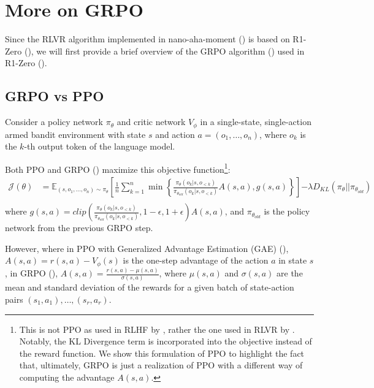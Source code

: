 \documentclass{article} %
\theoremstyle{definition}
\begin{document}
\section{More on GRPO}

Since the RLVR algorithm implemented in nano-aha-moment (\cite{nano-aha-moment}) is based on 
R1-Zero (\cite{r1}), we will first provide a brief overview of the GRPO
algorithm (\cite{grpo}) used in R1-Zero (\cite{r1}).

\subsection{GRPO vs PPO}
Consider a policy network $\pi_\theta$ and critic network $V_\phi$ in a single-state,
single-action armed bandit environment with state $s$ and action $a = (o_1, \dots, o_n)$,
where $o_k$ is the $k$-th output token of the language model.

Both PPO and GRPO (\cite{ppo, grpo}) maximize this objective function\footnote{
    This is not PPO as used in RLHF by \cite{InstructGPT-2022}, rather the one used in RLVR by \cite{grpo}.
    Notably, the KL Divergence term is incorporated into the objective instead of the reward function.
    We show this formulation of PPO to highlight the fact that, ultimately, GRPO is just a 
    realization of PPO with a different way of computing the advantage $A(s, a)$.
}:
\begin{equation}
    \label{eq:obj-fn}
    \begin{array}{rl}
        \mathcal{J}(\theta) &= \mathbb{E}_{(s, o_1, \dots, o_n) \sim \pi_\theta} \left[ 
            \displaystyle
            \frac{1}{n} \sum_{k = 1}^n \min \left\{
                \frac{\pi_\theta(o_k|s, o_{< k})}{\pi_{\theta_{old}}(o_k|s, o_{< k})} A(s, a),
                g(s, a)
            \right\}
        \right] {\displaystyle - \lambda D_{KL}(\pi_\theta || \pi_{\theta_{old}})} \\
    \end{array}
\end{equation}
where ${\displaystyle g(s, a) = clip\left(\frac{\pi_\theta(o_k|s, o_{< k})}{\pi_{\theta_{old}}(o_k|s, o_{< k})}, 1 - \epsilon, 1 + \epsilon \right) A(s, a)}$,
and $\pi_{\theta_{old}}$ is the policy network from the previous GRPO step.


However, where in PPO with Generalized Advantage Estimation (GAE) (\cite{ppo, gae}), $A(s, a) = r(s, a) - V_\phi(s)$ is the one-step advantage of the action $a$ in state $s$,
in GRPO (\cite{grpo}), $A(s, a) = \frac{r(s, a) - \mu(s, a)}{\sigma(s, a)}$, where $\mu(s, a)$ and $\sigma(s, a)$ are the mean and standard deviation of the rewards for a given batch of state-action
pairs $(s_1, a_1), \dots, (s_r, a_r)$.
\end{document}
